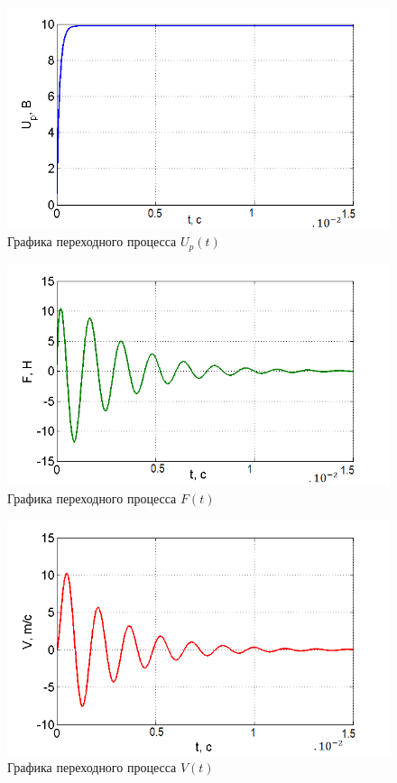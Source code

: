 \documentclass[a4paper, 12pt]{article}
\begin{document}
\newpage
	\begin{figure}[h]
		\centering
		\includegraphics[width=0.85\linewidth]{1}
		\caption{Графика переходного процесса $U_p(t)$}
		\label{fig:1}
	\end{figure}
	\begin{figure}[h]
		\centering
		\includegraphics[width=0.85\linewidth]{2}
		\caption{Графика переходного процесса $F(t)$}
		\label{fig:2}
	\end{figure}
\newpage
	\begin{figure}[h]
		\centering
		\includegraphics[width=0.8\linewidth]{3}
		\caption{Графика переходного процесса $V(t)$}
		\label{fig:3}
	\end{figure}
\end{document}
